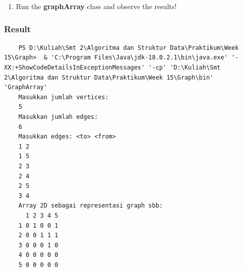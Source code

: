 \documentclass[12pt,titlepage]{article}
\begin{document}
\begin{enumerate}
\begin{verbatim}
                graph = new GraphArray(v);

                System.out.println("Masukkan edges: <to> <from>");
                while (count <= e) {
                    to = sc.nextInt();
                    from = sc.nextInt();

                    graph.makeEdge(to, from, 1);
                    count++;
                }
                System.out.println("Array 2D sebagai representasi graph sbb: ");
                System.out.print("  ");
                for (int i = 1; i <= v; i++) {
                    System.out.print(i + " ");
                }
                System.out.println();

                for (int i = 1; i <= v; i++) {
                    System.out.print(i + " ");
                    for (int j = 1; j <= v; j++) {
                        System.out.print(graph.getEdge(i, j) + " ");
                    }
                    System.out.println();
                }
            } catch (Exception E) {
                System.out.println("Error. silahkan cek kembali\n" + E.getMessage());
            }
            sc.close();
        }
    \end{verbatim}
    \item Run the \textbf{graphArray} class and observe the results!
\end{enumerate}

\subsubsection{Result}
\begin{verbatim}
    PS D:\Kuliah\Smt 2\Algoritma dan Struktur Data\Praktikum\Week 15\Graph>  & 'C:\Program Files\Java\jdk-18.0.2.1\bin\java.exe' '-XX:+ShowCodeDetailsInExceptionMessages' '-cp' 'D:\Kuliah\Smt 2\Algoritma dan Struktur Data\Praktikum\Week 15\Graph\bin' 'GraphArray'
    Masukkan jumlah vertices: 
    5
    Masukkan jumlah edges: 
    6
    Masukkan edges: <to> <from>
    1 2
    1 5
    2 3
    2 4
    2 5
    3 4
    Array 2D sebagai representasi graph sbb:
      1 2 3 4 5
    1 0 1 0 0 1
    2 0 0 1 1 1
    3 0 0 0 1 0
    4 0 0 0 0 0
    5 0 0 0 0 0
\end{verbatim}
\end{document}
